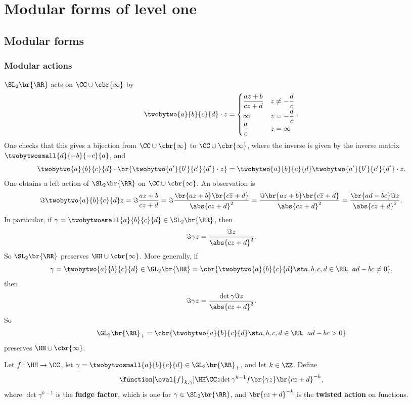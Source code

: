 \pagebreak

\section{Modular forms of level one}

\subsection{Modular forms}

\subsubsection{Modular actions}

$ \SL_2\br{\RR} $ acts on $ \CC \cup \cbr{\infty} $ by
$$ \twobytwo{a}{b}{c}{d} \cdot z =
\begin{cases}
\dfrac{az + b}{cz + d} & z \ne -\dfrac{d}{c} \\
\infty & z = -\dfrac{d}{c} \\
\dfrac{a}{c} & z = \infty
\end{cases}.
$$
One checks that this gives a bijection from $ \CC \cup \cbr{\infty} $ to $ \CC \cup \cbr{\infty} $, where the inverse is given by the inverse matrix $ \twobytwosmall{d}{-b}{-c}{a} $, and
$$ \twobytwo{a}{b}{c}{d} \cdot \br{\twobytwo{a'}{b'}{c'}{d'} \cdot z} = \twobytwo{a}{b}{c}{d}\twobytwo{a'}{b'}{c'}{d'} \cdot z. $$
One obtains a left action of $ \SL_2\br{\RR} $ on $ \CC \cup \cbr{\infty} $. An observation is
$$ \Im \twobytwo{a}{b}{c}{d}z = \Im \dfrac{az + b}{cz + d} = \Im \dfrac{\br{az + b}\br{c\overline{z} + d}}{\abs{cz + d}^2} = \dfrac{\Im \br{az + b}\br{c\overline{z} + d}}{\abs{cz + d}^2} = \dfrac{\br{ad - bc}\Im z}{\abs{cz + d}^2}. $$
In particular, if $ \gamma = \twobytwosmall{a}{b}{c}{d} \in \SL_2\br{\RR} $, then
$$ \Im \gamma z = \dfrac{\Im z}{\abs{cz + d}^2}. $$
So $ \SL_2\br{\RR} $ preserves $ \HH \cup \cbr{\infty} $. More generally, if
$$ \gamma = \twobytwo{a}{b}{c}{d} \in \GL_2\br{\RR} = \cbr{\twobytwo{a}{b}{c}{d} \st a, b, c, d \in \RR, \ ad - bc \ne 0}, $$
then
$$ \Im \gamma z = \dfrac{\det \gamma\Im z}{\abs{cz + d}^2}. $$
So
$$ \GL_2\br{\RR}_+ = \cbr{\twobytwo{a}{b}{c}{d} \st a, b, c, d \in \RR, \ ad - bc > 0} $$
preserves $ \HH \cup \cbr{\infty} $.


\begin{definition}
Let $ f : \HH \to \CC $, let $ \gamma = \twobytwosmall{a}{b}{c}{d} \in \GL_2\br{\RR}_+ $, and let $ k \in \ZZ $. Define
$$ \function[\eval{f}_{k, \gamma}]{\HH}{\CC}{z}{\det \gamma^{k - 1}f\br{\gamma z}\br{cz + d}^{-k}}, $$
where $ \det \gamma^{k - 1} $ is the \textbf{fudge factor}, which is one for $ \gamma \in \SL_2\br{\RR} $, and $ \br{cz + d}^{-k} $ is the \textbf{twisted action} on functions.
\end{definition}

